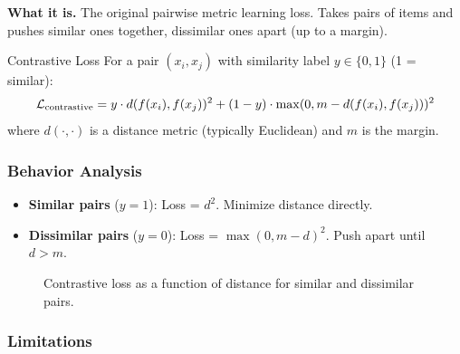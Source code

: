 \textbf{What it is.} The original pairwise metric learning loss. Takes pairs of items and pushes similar ones together, dissimilar ones apart (up to a margin).

\begin{mathresult}{Contrastive Loss}
For a pair $(x_i, x_j)$ with similarity label $y \in \{0, 1\}$ (1 = similar):
\begin{equation}
\mathcal{L}_{\text{contrastive}} = y \cdot d(f(x_i), f(x_j))^2 + (1-y) \cdot \max(0, m - d(f(x_i), f(x_j)))^2
\end{equation}
where $d(\cdot, \cdot)$ is a distance metric (typically Euclidean) and $m$ is the margin.
\end{mathresult}

\subsubsection{Behavior Analysis}

\begin{itemize}
    \item \textbf{Similar pairs} ($y=1$): Loss = $d^2$. Minimize distance directly.
    \item \textbf{Dissimilar pairs} ($y=0$): Loss = $\max(0, m-d)^2$. Push apart until $d > m$.
\end{itemize}

\begin{figure}[H]
\centering
{}
\caption{Contrastive loss as a function of distance for similar and dissimilar pairs.}
\end{figure}

\subsubsection{Limitations}

